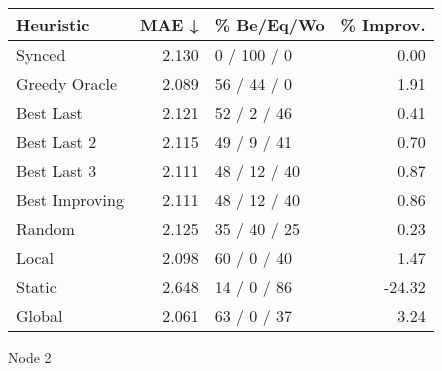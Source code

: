 \begin{tabular}{lrlr}
\toprule
\textbf{Heuristic} & \textbf{MAE ↓} & \textbf{\% Be/Eq/Wo} & \textbf{\% Improv.} \\
\midrule
            Synced &          2.130 &          0 / 100 / 0 &                0.00 \\
     Greedy Oracle &          2.089 &          56 / 44 / 0 &                1.91 \\
         Best Last &          2.121 &          52 / 2 / 46 &                0.41 \\
       Best Last 2 &          2.115 &          49 / 9 / 41 &                0.70 \\
       Best Last 3 &          2.111 &         48 / 12 / 40 &                0.87 \\
    Best Improving &          2.111 &         48 / 12 / 40 &                0.86 \\
            Random &          2.125 &         35 / 40 / 25 &                0.23 \\
             Local &          2.098 &          60 / 0 / 40 &                1.47 \\
            Static &          2.648 &          14 / 0 / 86 &              -24.32 \\
            Global &          2.061 &          63 / 0 / 37 &                3.24 \\
\bottomrule
\end{tabular}
\caption{Node 2}
\label{tab:hr_non_lr01_le1_bs4_2}
